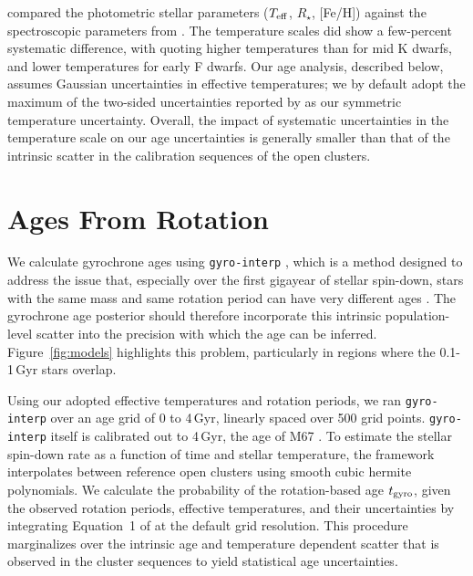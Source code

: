 \documentclass[11pt,twocolumn,tighten]{aastex63}
\begin{document}
\citet{David_2021} compared the photometric
 stellar parameters ($T_{\rm eff}$,
$R_\star$, [Fe/H]) against the spectroscopic parameters from
\citet{Fulton_2018}.  The temperature scales did show a few-percent
systematic difference, with  quoting higher
temperatures than  for mid K dwarfs,
and lower temperatures for early F dwarfs.  Our age analysis,
described below, assumes Gaussian uncertainties in effective
temperatures; we by default adopt the maximum of the two-sided
uncertainties reported by  as our
symmetric temperature uncertainty.  Overall, the impact of systematic
uncertainties in the temperature scale on our age uncertainties is
generally smaller than that of the intrinsic scatter in the
calibration sequences of the open clusters.





\section{Ages From Rotation}
\label{sec:rotage}

We calculate gyrochrone ages using \texttt{gyro-interp}
\citep{Bouma_2023}, which is a method designed to address the issue
that, especially over the first gigayear of stellar spin-down, stars
with the same mass and same rotation period can have very different
ages \citep[e.g.][]{Curtis_2019_ngc6811}.  The gyrochrone age
posterior should therefore incorporate this intrinsic population-level
scatter into the precision with which the age can be inferred.
Figure~\ref{fig:models} highlights this problem, particularly in
regions where the 0.1-1\,Gyr stars overlap.

Using our adopted effective temperatures and rotation periods, we ran
\texttt{gyro-interp} over an age grid of 0 to 4\,Gyr, linearly spaced
over 500 grid points.  \texttt{gyro-interp} itself is calibrated out
to 4\,Gyr, the age of M67
\citep[see][]{2022ApJ...938..118D,Gruner_2023}.  To estimate the
stellar spin-down rate as a function of time and stellar temperature,
the framework interpolates between reference open clusters using
smooth cubic hermite polynomials.  We calculate the probability of the
rotation-based age $t_{\rm gyro}$, given the observed rotation
periods, effective temperatures, and their uncertainties by
integrating Equation~1 of \citet{Bouma_2023} at the default grid
resolution.  This procedure marginalizes over the intrinsic age and
temperature dependent scatter that is observed in the cluster
sequences to yield statistical age uncertainties.
\end{document}
